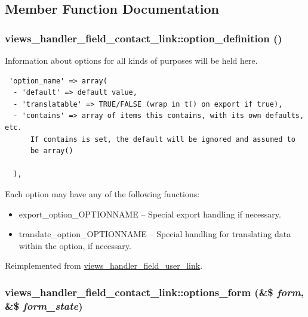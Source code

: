 \subsection{Member Function Documentation}
\hypertarget{classviews__handler__field__contact__link_33c1b1091d417e0e5a1b82bfdc81b83b}{
\subsubsection[{option\_\-definition}]{\setlength{\rightskip}{0pt plus 5cm}views\_\-handler\_\-field\_\-contact\_\-link::option\_\-definition ()}}
\label{classviews__handler__field__contact__link_33c1b1091d417e0e5a1b82bfdc81b83b}


Information about options for all kinds of purposes will be held here. 

\begin{Code}\begin{verbatim} 'option_name' => array(
  - 'default' => default value,
  - 'translatable' => TRUE/FALSE (wrap in t() on export if true),
  - 'contains' => array of items this contains, with its own defaults, etc.
      If contains is set, the default will be ignored and assumed to
      be array()

  ),
\end{verbatim}
\end{Code}

 Each option may have any of the following functions:\begin{itemize}
\item export\_\-option\_\-OPTIONNAME -- Special export handling if necessary.\item translate\_\-option\_\-OPTIONNAME -- Special handling for translating data within the option, if necessary. \end{itemize}


Reimplemented from \hyperlink{classviews__handler__field__user__link_61509d4fd4bc1c98a52e550c56d42b5d}{views\_\-handler\_\-field\_\-user\_\-link}.\hypertarget{classviews__handler__field__contact__link_d6709f7a6f48dc51fe3952f26598e622}{
\subsubsection[{options\_\-form}]{\setlength{\rightskip}{0pt plus 5cm}views\_\-handler\_\-field\_\-contact\_\-link::options\_\-form (\&\$ {\em form}, \/  \&\$ {\em form\_\-state})}}
\label{classviews__handler__field__contact__link_d6709f7a6f48dc51fe3952f26598e622}


